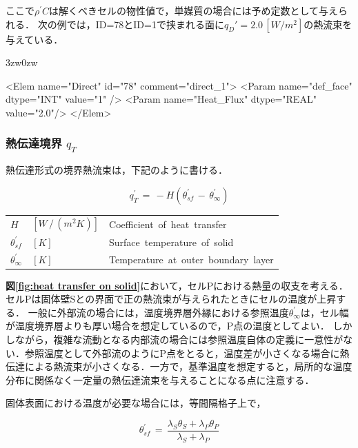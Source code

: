 \noindent ここで$\rho^{\prime}C$は解くべきセルの物性値で，単媒質の場合には予め定数として与えられる．
次の例では，ID=78とID=1で挟まれる面に$q_{D}'=2.0\, [W/m^2]$の熱流束を与えている．
\begin{indentation}{3zw}{0zw}
{
\small
\begin{program}
<Elem name="Direct" id="78" comment="direct_1">
  <Param name="def_face"  dtype="INT"  value="1" />
  <Param name="Heat_Flux" dtype="REAL" value="2.0"/>
</Elem>
\end{program}
}
\end{indentation}

%
\subsubsection{熱伝達境界 $q_T$}
\label{sec:Heat_Transfer_BC}
熱伝達形式の境界熱流束は，下記のように書ける．

\begin{equation}
{q}_{T}^{\prime} \,=\, -H(\theta_{sf}^{\prime}\,-\,\theta_{\infty}^{\prime})
\label{eq:qT2}
\end{equation}

\begin{center}
\begin{tabular}{lll}
$H$ &  $[W\,/\,(m^2K)]$ & Coefficient\, of\, heat\, transfer\\
$\theta_{sf}^{\prime}$ & $[K]$ & Surface\, temperature\, of\, solid\\
$\theta_{\infty}^{\prime}$ & $[K]$ & Temperature\, at\, outer\, boundary\, layer\\
\end{tabular}
\end{center}

\textbf{図\ref{fig:heat transfer on solid}}において，セルPにおける熱量の収支を考える．セルPは固体壁Sとの界面で正の熱流束が与えられたときにセルの温度が上昇する．
一般に外部流の場合には，温度境界層外縁における参照温度$\theta_{\infty}^{\prime}$は，セル幅が温度境界層よりも厚い場合を想定しているので，P点の温度としてよい．
しかしながら，複雑な流動となる内部流の場合には参照温度自体の定義に一意性がない．参照温度として外部流のようにP点をとると，温度差が小さくなる場合に熱伝達による熱流束が小さくなる．一方で，基準温度を想定すると，局所的な温度分布に関係なく一定量の熱伝達流束を与えることになる点に注意する．

固体表面における温度が必要な場合には，等間隔格子上で，

\begin{equation}
\theta_{sf}^{\prime} \,=\, \frac{\lambda_{S} \theta_{S} + \lambda_{P} \theta_{P}}{\lambda_{S} + \lambda_{P}}
\label{eq:qT3}
\end{equation}

